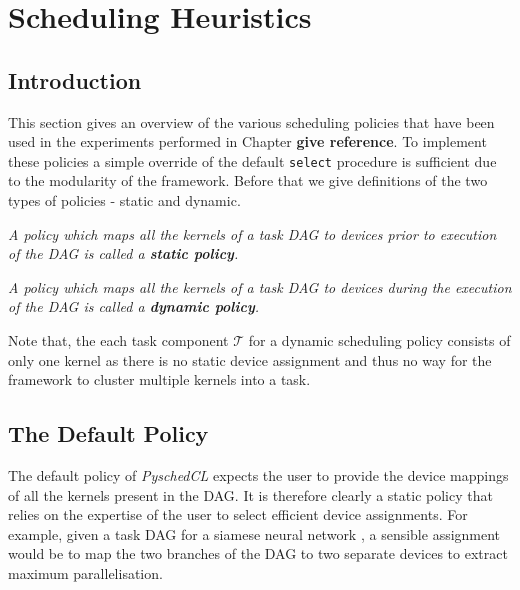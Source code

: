 
\chapter{Scheduling Heuristics} %

\label{Chapter5} %



\section{Introduction}
This section gives an overview of the various scheduling policies that have been used in the experiments performed in Chapter \textbf{give reference}. To implement these policies a simple override of the default {\tt select} procedure is sufficient due to the modularity of the framework. Before that we give definitions of the two types of policies - static and dynamic. 

\begin{definition}
    \emph{A policy which maps all the kernels of a task DAG to devices prior to execution of the DAG is called a \textbf{static policy}.} 
\end{definition}
\begin{definition}
    \emph{A policy which maps all the kernels of a task DAG to devices during the execution of the DAG is called a \textbf{dynamic policy}.} 
\end{definition}

Note that, the each task component $\mathcal{T}$ for a dynamic scheduling policy consists of only one kernel as there is no static device assignment and thus no way for the framework to cluster multiple kernels into a task.

\section{The Default Policy}
The default policy of \emph{PyschedCL} expects the user to provide the device mappings of all the kernels present in the DAG. It is therefore clearly a static policy that relies on the expertise of the user to select efficient device assignments. For example, given a task DAG for a siamese neural network \cite{siamese}, a sensible assignment would be to map the two branches of the DAG to two separate devices to extract maximum parallelisation.  

